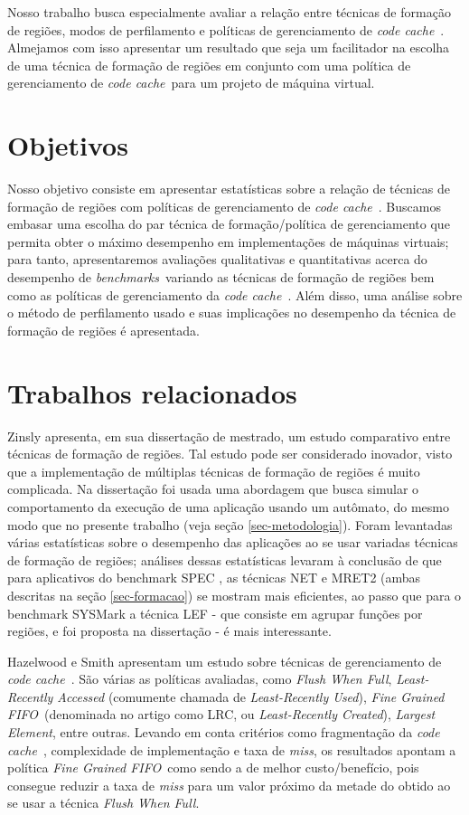 \documentclass[12pt,twoside]{article}
\newcommand{\ccache}{\emph{code cache}}
\newcommand{\benchmarks}{\emph{benchmarks}}
\newcommand{\flush}{\emph{Flush When Full}}
\newcommand{\finefifo}{\emph{Fine Grained FIFO}}
\begin{document}
Nosso trabalho busca especialmente avaliar a relação entre técnicas de formação de regiões, modos de perfilamento e políticas de gerenciamento de \ccache~. Almejamos com isso apresentar um resultado que seja um facilitador na escolha de uma técnica de formação de regiões em conjunto com uma política de gerenciamento de \ccache~para um projeto de máquina virtual. 


\section{Objetivos}
Nosso objetivo consiste em apresentar estatísticas sobre a relação de técnicas de formação de regiões com políticas de gerenciamento de \ccache~. Buscamos embasar uma escolha do par técnica de formação/política de gerenciamento que permita obter o máximo desempenho em implementações de máquinas virtuais; para tanto, apresentaremos avaliações qualitativas e quantitativas acerca do desempenho de \benchmarks~variando as técnicas de formação de regiões bem como as políticas de gerenciamento da \ccache~. Além disso, uma análise sobre o método de perfilamento usado e suas implicações no desempenho da técnica de formação de regiões é apresentada.


\section{Trabalhos relacionados}
Zinsly \cite{thesis-zinsly} apresenta, em sua dissertação de mestrado, um estudo comparativo entre técnicas de formação de regiões. Tal estudo pode ser considerado inovador, visto que a implementação de múltiplas técnicas de formação de regiões é muito complicada. Na dissertação foi usada uma abordagem que busca simular o comportamento da execução de uma aplicação usando um autômato, do mesmo modo que no presente trabalho (veja seção \ref{sec-metodologia}). Foram levantadas várias estatísticas sobre o desempenho das aplicações ao se usar variadas técnicas de formação de regiões; análises dessas estatísticas levaram à conclusão de que para aplicativos do benchmark SPEC \cite{spec-url}, as técnicas NET e MRET2 (ambas descritas na seção \ref{sec-formacao}) se mostram mais eficientes, ao passo que para o benchmark SYSMark \cite{sysmark-url} a técnica LEF - que consiste em agrupar funções por regiões, e foi proposta na dissertação - é mais interessante. 

Hazelwood e Smith \cite{hazelwood-2002} apresentam um estudo sobre técnicas de gerenciamento de \ccache~. São várias as políticas avaliadas, como \flush, \emph{Least-Recently Accessed} (comumente chamada de \emph{Least-Recently Used}), \finefifo~(denominada no artigo como LRC, ou \emph{Least-Recently Created}),\emph{ Largest Element}, entre outras. Levando em conta critérios como fragmentação da \ccache~, complexidade de implementação e taxa de \emph{miss}, os resultados apontam a política \finefifo~como sendo a de melhor custo/benefício, pois consegue reduzir a taxa de \emph{miss} para um valor próximo da metade do obtido ao se usar a técnica \flush.
\end{document}
